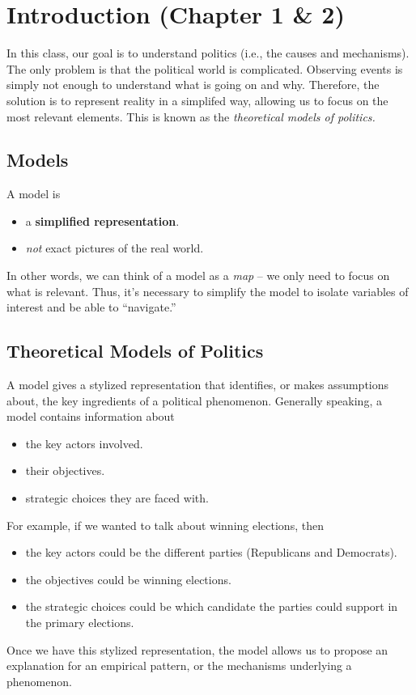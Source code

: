 \documentclass[letterpaper]{article}
\begin{document}
\section{Introduction (Chapter 1 \& 2)}
In this class, our goal is to understand politics (i.e., the causes and mechanisms). The only problem is that the political world is complicated. Observing events is simply not enough to understand what is going on and why. Therefore, the solution is to represent reality in a simplifed way, allowing us to focus on the most relevant elements. This is known as the \emph{theoretical models of politics.}

\subsection{Models}
A model is
\begin{itemize}
    \item a \textbf{simplified representation}. 
    \item \emph{not} exact pictures of the real world.
\end{itemize}
In other words, we can think of a model as a \emph{map} -- we only need to focus on what is relevant. Thus, it's necessary to simplify the model to isolate variables of interest and be able to ``navigate.''

\subsection{Theoretical Models of Politics}
A model gives a stylized representation that identifies, or makes assumptions about, the key ingredients of a political phenomenon. Generally speaking, a model contains information about  
\begin{itemize}
    \item the key actors involved. 
    \item their objectives. 
    \item strategic choices they are faced with. 
\end{itemize}
For example, if we wanted to talk about winning elections, then 
\begin{itemize}
    \item the key actors could be the different parties (Republicans and Democrats).
    \item the objectives could be winning elections. 
    \item the strategic choices could be which candidate the parties could support in the primary elections.
\end{itemize}
Once we have this stylized representation, the model allows us to propose an explanation for an empirical pattern, or the mechanisms underlying a phenomenon. 
\end{document}
